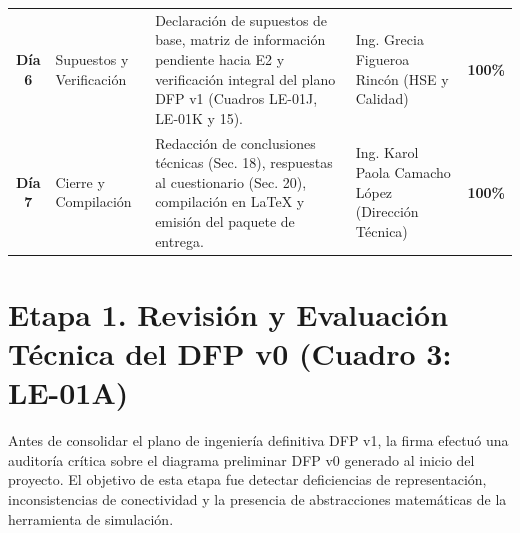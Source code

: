 \documentclass[10pt,letterpaper]{article}
\begin{document}
\begin{table}[H]
\begin{tabularx}{\textwidth}{c p{3.0cm} X p{3.6cm} c}
\textbf{Día 6} & Supuestos y Verificación & Declaración de supuestos de base, matriz de información pendiente hacia E2 y verificación integral del plano DFP v1 (Cuadros LE-01J, LE-01K y 15). & Ing. Grecia Figueroa Rincón (HSE y Calidad) & \textbf{100\%} \\
\textbf{Día 7} & Cierre y Compilación & Redacción de conclusiones técnicas (Sec. 18), respuestas al cuestionario (Sec. 20), compilación en LaTeX y emisión del paquete de entrega. & Ing. Karol Paola Camacho López (Dirección Técnica) & \textbf{100\%} \\
\bottomrule
\end{tabularx}
\end{table}

\newpage
\section{Etapa 1. Revisión y Evaluación Técnica del DFP v0 (Cuadro 3: LE-01A)}

Antes de consolidar el plano de ingeniería definitiva DFP v1, la firma efectuó una auditoría crítica sobre el diagrama preliminar DFP v0 generado al inicio del proyecto. El objetivo de esta etapa fue detectar deficiencias de representación, inconsistencias de conectividad y la presencia de abstracciones matemáticas de la herramienta de simulación.
\end{document}
